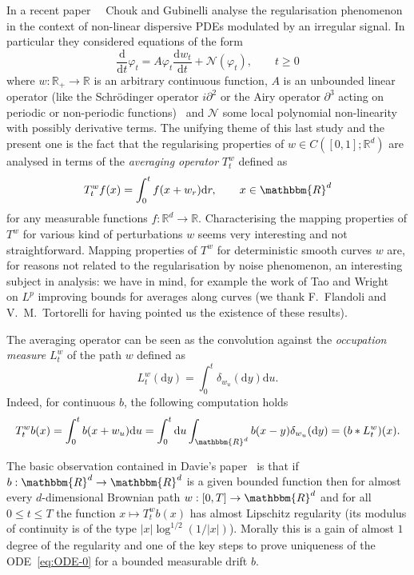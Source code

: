 \documentclass[a4paper,11pt]{article}
\newcommand{\mathd}{\mathrm{d}}
\newcommand{\tmtextit}[1]{{\itshape{#1}}}
\newcommand{\CN}{\mathscr N}
\newcommand{\RR}{\mathbb R}
\begin{document}
In a recent paper~{\cite{random-modulation-1,random-modulation-2}} \ Chouk
and Gubinelli analyse the regularisation phenomenon in the context of
non-linear dispersive PDEs modulated by an irregular signal. In particular
they considered equations of the form
\begin{equation}
  \label{eq:abs} \frac{\mathd}{\mathd t} \varphi_{t} =A \varphi_{t} 
  \frac{\mathd w_{t}}{\mathd t} +\CN ( \varphi_{t} ) , \hspace{2em} t
  \ge 0
\end{equation}
where $w: \RR_{+} \to \RR$ is an arbitrary continuous function, $A$ is an
unbounded linear operator (like the Schrödinger operator $i \partial^{2}$ or
the Airy operator $\partial^{3}$ acting on periodic or non-periodic functions)
\ and $\CN$ some local polynomial non-linearity with possibly
derivative terms. The unifying theme of this last study and the present one is
the fact that the regularising properties of $w \in C ([0,1]; \RR^{d} )$ are
analysed in terms of the \tmtextit{averaging operator} $T^{w}_{t}$ defined as
\begin{equation}
  T^{w}_{t} f (x) = \int_{0}^{t} f (x+w_{r} ) \mathd r, \hspace{2em} x \in
  \mathbbm{R}^{d} \label{eq:averaging-op}
\end{equation}
for any measurable functions $f: \RR^{d} \to \RR$. Characterising the mapping
properties of $T^{w}$ for various kind of perturbations $w$ seems very
interesting and not straightforward. Mapping properties of $T^{w}$ for
deterministic smooth curves $w$ are, for reasons not related to the
regularisation by noise phenomenon, an interesting subject in analysis: we
have in mind, for example the work of Tao and Wright~{\cite{tao}} on $L^{p}$
improving bounds for averages along curves (we thank F.~Flandoli and
V.~M.~Tortorelli for having pointed us the existence of these results). \



The averaging operator can be seen as the convolution against the
\tmtextit{occupation measure} $L^{w}_{t}$ of the path $w$ defined as
\[ L^{w}_{t} ( \mathd y ) = \int_{0}^{t } \delta_{w_{u}} ( \mathd y ) \mathd u. \]
Indeed, for continuous $b$, the following computation holds
\[ T^{w}_{t} b ( x ) = \int_{0}^{t} b ( x+w_{u} ) \mathd u = \int_{0}^{t}
   \mathd u \int_{\mathbbm{R}^{d}}  b ( x-y ) \delta_{w_{u}} ( \mathd y ) = (
   b \ast L_{t}^{w} ) ( x ) . \]


The basic observation contained in Davie's paper~{\cite{MR2377011}} is that if
$b:\mathbbm{R}^{d} \rightarrow \mathbbm{R}^{d}$ is a given bounded function
then for almost every $d$-dimensional Brownian path $w: [ 0,T ] \rightarrow
\mathbbm{R}^{d}$ and for all $0 \leqslant t \leqslant T$ the function $x
\mapsto T^{w}_{t} b ( x )$ has almost Lipschitz regularity (its modulus of
continuity is of the type $| x | \log^{1/2}_{} ( 1/ | x | )$). Morally this is
a gain of almost $1$ degree of the regularity and one of the key steps to prove
uniqueness of the ODE~{\eqref{eq:ODE-0}} for a bounded measurable drift $b$.
\end{document}

